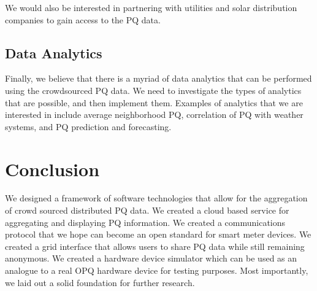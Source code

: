 \documentclass[11pt]{article}
\begin{document}
We would also be interested in partnering with utilities and solar distribution companies to gain access to the PQ data.

\subsection{Data Analytics}
Finally, we believe that there is a myriad of data analytics that can be performed using the crowdsourced PQ data. We need to investigate the types of analytics that are possible, and then implement them. Examples of analytics that we are interested in include average neighborhood PQ, correlation of PQ with weather systems, and PQ prediction and forecasting.

\section{Conclusion}
We designed a framework of software technologies that allow for the aggregation of crowd sourced distributed PQ data. We created a cloud based service for aggregating and displaying PQ information. We created a communications protocol that we hope can become an open standard for smart meter devices. We created a grid interface that allows users to share PQ data while still remaining anonymous. We created a hardware device simulator which can be used as an analogue to a real OPQ hardware device for testing purposes. Most importantly, we laid out a solid foundation for further research.

\appendix





\end{document}
